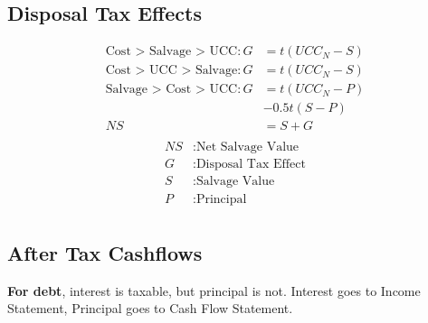 \documentclass[landscape, letterpaper, 10pt]{article}
\begin{document}
\begin{multicols}{3}
    \subsection*{Disposal Tax Effects}
    \begin{align*}
        \text{Cost > Salvage > UCC}: G & = t(UCC_N - S) \\
        \text{Cost > UCC > Salvage}: G & = t(UCC_N - S) \\
        \text{Salvage > Cost > UCC}: G & = t(UCC_N - P) \\
                                       & - 0.5t(S-P)    \\
        NS                             & = S + G        \\
    \end{align*}
    \begin{align*}
        NS & : \text{Net Salvage Value}   \\
        G  & : \text{Disposal Tax Effect} \\
        S  & : \text{Salvage Value}       \\
        P  & : \text{Principal}           \\
    \end{align*}
    \subsection*{After Tax Cashflows}

    \textbf{For debt}, interest is taxable, but principal is not. Interest goes to Income Statement, Principal goes to Cash Flow Statement.


\end{multicols}
\end{document}

